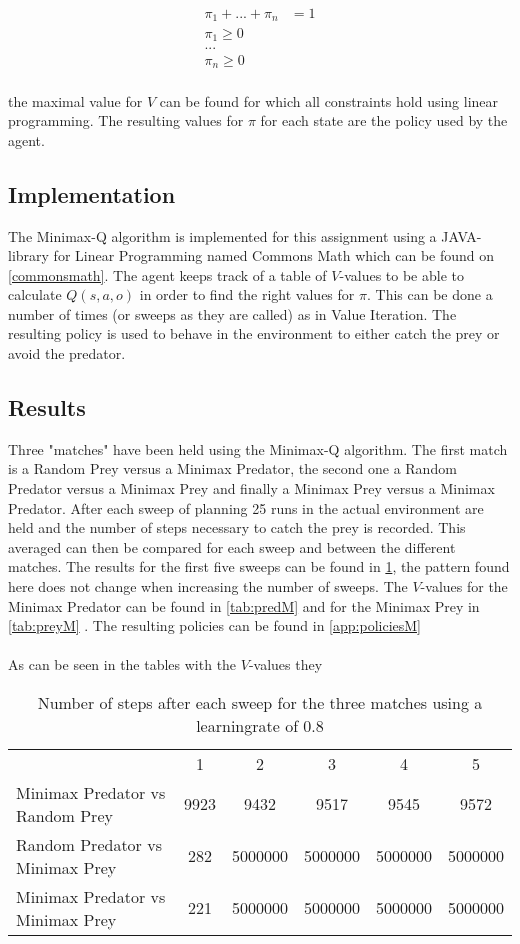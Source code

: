 \begin{align*}
\pi_1 + ... + \pi_n &= 1\\
\pi_1 \geq 0\\
...\\
\pi_n  \geq 0\\
\end{align*}

the maximal value for $V$ can be found for which all constraints hold using linear programming. The resulting values for $\pi$ for each state are the policy used by the agent.

\subsection{Implementation}
The Minimax-Q algorithm is implemented for this assignment using a JAVA-library for Linear Programming named Commons Math which can be found on \ref{commonsmath}. The agent keeps track of a table of $V$-values to be able to calculate $Q(s,a,o)$ in order to find the right values for $\pi$. This can be done a number of times (or sweeps as they are called) as in Value Iteration. The resulting policy is used to behave in the environment to either catch the prey or avoid the predator.

\subsection{Results}
Three "matches" have been held using the Minimax-Q algorithm. The first match is a Random Prey versus a Minimax Predator, the second one a Random Predator versus a Minimax Prey and finally a Minimax Prey versus a Minimax Predator. After each sweep of planning 25 runs in the actual environment are held and the number of steps necessary to catch the prey is recorded. This averaged can then be compared for each sweep and between the different matches. The results for the first five sweeps can be found in \ref{tab:minimaxTable}, the pattern found here does not change when increasing the number of sweeps. The $V$-values for the Minimax Predator can be found in \ref{tab:predM} and for the Minimax Prey in \ref{tab:preyM} .  The resulting policies can be found in \ref{app:policiesM} \\\\
As can be seen in the tables with the $V$-values they 

\begin{table}[htb]
\centering
\begin{tabular}{lccccc}
&1&2&3&4&5\\
Minimax Predator vs Random Prey & 9923 & 9432&9517&9545&9572\\
Random Predator vs Minimax Prey & 282& 5000000& 5000000& 5000000& 5000000\\
Minimax Predator vs Minimax Prey & 221& 5000000& 5000000& 5000000& 5000000\\
\end{tabular}
\caption{Number of steps after each sweep for the three matches using a learningrate of 0.8}
\label{tab:minimaxTable}
\end{table}


